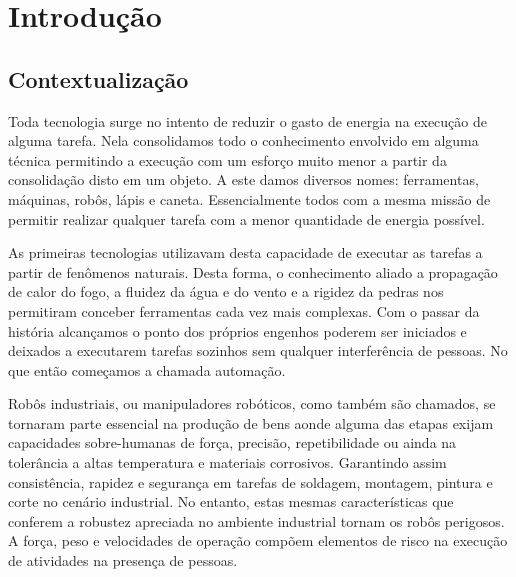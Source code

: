 \chapter{Introdução} \label{ch:intro}



\section{Contextualização}

Toda tecnologia surge no intento de reduzir o gasto de energia na execução de alguma tarefa. Nela consolidamos todo o conhecimento envolvido em alguma técnica permitindo a execução com um esforço muito menor a partir da consolidação disto em um objeto. A este damos diversos nomes: ferramentas, máquinas, robôs, lápis e caneta. Essencialmente todos com a mesma missão de permitir realizar qualquer tarefa com a menor quantidade de energia possível.

As primeiras tecnologias utilizavam desta capacidade de executar as tarefas a partir de fenômenos naturais. Desta forma, o conhecimento aliado a propagação de calor do fogo, a fluidez da água e do vento e a rigidez da pedras nos permitiram conceber ferramentas cada vez mais complexas. Com o passar da história alcançamos o ponto dos próprios engenhos poderem ser iniciados e deixados a executarem tarefas sozinhos sem qualquer interferência de pessoas. No que então começamos a chamada automação.



Robôs industriais, ou manipuladores robóticos, como também são chamados, se tornaram parte essencial na produção de bens aonde alguma das etapas exijam capacidades sobre-humanas de força, precisão, repetibilidade ou ainda na tolerância a altas temperatura e materiais corrosivos. Garantindo assim consistência, rapidez e segurança em tarefas de soldagem, montagem, pintura e corte no cenário industrial. No entanto, estas mesmas características que conferem a robustez apreciada no ambiente industrial tornam os robôs perigosos. A força, peso e velocidades de operação compõem elementos de risco na execução de atividades na presença de pessoas.

